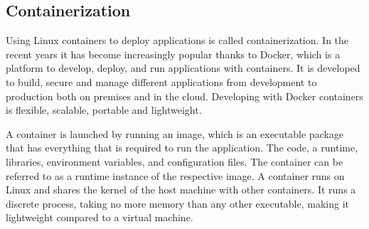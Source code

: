 \subsection{Containerization}
Using Linux containers to deploy applications is called containerization. In the recent years it has become increasingly popular thanks to Docker, which is a platform to develop, deploy, and run applications with containers. It is developed to build, secure and manage different applications from development to production both on premises and in the cloud. Developing with Docker containers is flexible, scalable, portable and lightweight.

A container is launched by running an image, which is an executable package that has everything that is required to run the application. The code, a runtime, libraries, environment variables, and configuration files. The container can be referred to as a runtime instance of the respective image. A container runs on Linux and shares the kernel of the host machine with other containers. It runs a discrete process, taking no more memory than any other executable, making it lightweight compared to a virtual machine.\cite{docker}